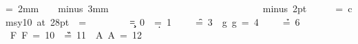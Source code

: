 \newdimen\unit \unit=2mm
\newskip\pskip \pskip=3mm minus 3mm
\newdimen\rem
\newdimen\ww
\newdimen\minw \minw=5mm
\newcount\min {}
\newcount\max {}
\newcount\hh
\newbox\textbox
\newif\iflead

\newdimen\normalspace \normalspace=3.33pt
\newdimen\xdiff
\newdimen\prevxdiff
\newdimen\skiplen
\newskip\leadskip

\parindent=0pt
\parskip=10pt minus 2pt
\footline{\hfil}
\font\largesym=cmsy10 at 28pt
=\largesym

\def\lead{\leaders\vrule height 2.25pt depth -2pt}

\def\\{\hfill\break}

\long\def\nota#1#2#3{%
  \leavevmode
  \setbox\textbox=\hbox{#2\hskip0pt}%
  \ww=\wd\textbox
  \ifdim \ww<\minw \ww=\minw \fi
  \prevxdiff=\xdiff
  \xdiff=\wd\textbox
  \advance\xdiff by -\minw
  \divide\xdiff by 2
  \skiplen=0pt
  \ifdim \prevxdiff<0pt
    \ifdim \xdiff>0pt
      \ifdim \xdiff<-\prevxdiff \skiplen=\xdiff \else \skiplen=-\prevxdiff \fi
    \fi
  \else
    \ifdim \xdiff<0pt
      \ifdim \prevxdiff<-\xdiff \skiplen=\prevxdiff \else \skiplen=-\xdiff \fi
    \fi
  \fi
  \hskip -\skiplen
  \ifdim\prevxdiff<0pt \leadskip=-\prevxdiff \else \leadskip=0pt \fi
  \ifdim\xdiff<0pt \advance\leadskip by -\xdiff \fi
  \advance\leadskip by -\skiplen
  \ifdim\leadskip<0.7pt \leadskip=0pt \fi
  \vbox{%
    \hh=-#1%
    \advance\hh by \max
    \vskip\hh\unit
    \hbox to \ww{%
      \hfil
      \pdfliteral{q \barva{#1} rg}%
      \hbox to 0pt{\hss$\bullet$\hss}%
      \pdfliteral{Q}%
      \hbox to 0pt{\hss$\circ$\hss}%
      \hfil
    }%
    \hh=#1%
    \advance\hh by -\min
    \vskip \hh\unit
    \hbox to \ww{%
      \hfil
      \iflead\hbox to 0pt{\hskip-\leadskip \lead\hfil}\fi
      #2#3%
      \hfil
    }%
  }%
  \relax
}

\def\p{\hskip\pskip\nobreak\ignorespaces}
\def\pp{%
  \leadskip=\pskip
  \ifdim\xdiff<0pt \hskip\xdiff \fi
  \advance\leadskip by -\xdiff
  \xdiff=0pt
  \lead\hskip\leadskip\nobreak\ignorespaces}

\newcount\c \c=0
\newcount\d \d=1
\newcount\e {}
\newcount\f \f=3
\newcount\g \g=4
\newcount\a {}
\newcount\h \h=6
\newcount\C {}
\newcount\D {}
\newcount\E {}
\newcount\F \F=10
\newcount\G \G=11
\newcount\A \A=12

\def\toix#1{\csname#1\endcsname}

\def\barva#1{\ifcase#1%
  1 0 0\or
  0 1 0\or
  1 1 0\or
  0.6 0.4 0\or
  0.2 0.2 1\or
  0.7 0 0.7\or
  1 1 1\or
  1 0 0\or
  0 1 0\or
  1 1 0\or
  0.6 0.4 0\or
  0.2 0.2 1\or
  0.7 0 0.7\fi}

